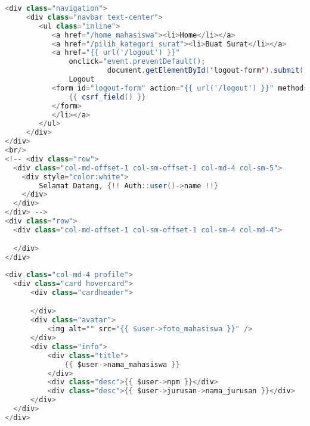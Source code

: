 \begin{lstlisting}[language=Java,basicstyle=\tiny,caption=\textit{Navigation bar} untuk mahasiswa]
	<div class="navigation">
     <div class="navbar text-center">
        <ul class="inline">
           <a href="/home_mahasiswa"><li>Home</li></a>
           <a href="/pilih_kategori_surat"><li>Buat Surat</li></a>
           <a href="{{ url('/logout') }}"
               onclick="event.preventDefault();
                        document.getElementById('logout-form').submit();"><li>
               Logout
           <form id="logout-form" action="{{ url('/logout') }}" method="POST" style="display: none;">
               {{ csrf_field() }}
           </form>
           </li></a>
        </ul>
     </div>
</div>
<br/>
<!-- <div class="row">
  <div class="col-md-offset-1 col-sm-offset-1 col-md-4 col-sm-5">
    <div style="color:white">
        Selamat Datang, {!! Auth::user()->name !!}
    </div>
  </div>
</div> -->
<div class="row">
  <div class="col-md-offset-1 col-sm-offset-1 col-sm-4 col-md-4">

  </div>
</div>

\end{lstlisting}

\begin{lstlisting}[language=Java,basicstyle=\tiny,caption=\textit{Sidebar} untuk mahasiswa]
	<div class="col-md-4 profile">
  <div class="card hovercard">
      <div class="cardheader">

      </div>
      <div class="avatar">
          <img alt="" src="{{ $user->foto_mahasiswa }}" />
      </div>
      <div class="info">
          <div class="title">
              {{ $user->nama_mahasiswa }}
          </div>
          <div class="desc">{{ $user->npm }}</div>
          <div class="desc">{{ $user->jurusan->nama_jurusan }}</div>
      </div>
  </div>
</div>

\end{lstlisting}

